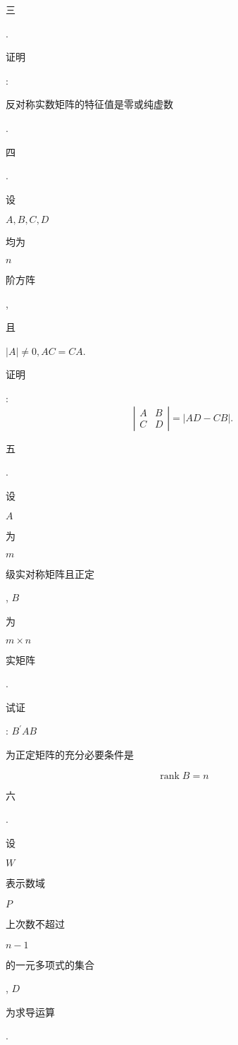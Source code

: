 \documentclass[10pt]{article}
\begin{document}
\begin{CJK}{UTF8}{mj}三\end{CJK}. \begin{CJK}{UTF8}{mj}证明\end{CJK}: \begin{CJK}{UTF8}{mj}反对称实数矩阵的特征值是零或纯虚数\end{CJK}.

\begin{CJK}{UTF8}{mj}四\end{CJK}. \begin{CJK}{UTF8}{mj}设\end{CJK} $A, B, C, D$ \begin{CJK}{UTF8}{mj}均为\end{CJK} $n$ \begin{CJK}{UTF8}{mj}阶方阵\end{CJK}, \begin{CJK}{UTF8}{mj}且\end{CJK} $|A| \neq 0, A C=C A$. \begin{CJK}{UTF8}{mj}证明\end{CJK}:
$$
\left|\begin{array}{ll}
A & B \\
C & D
\end{array}\right|=|A D-C B| .
$$
\begin{CJK}{UTF8}{mj}五\end{CJK}. \begin{CJK}{UTF8}{mj}设\end{CJK} $A$ \begin{CJK}{UTF8}{mj}为\end{CJK} $m$ \begin{CJK}{UTF8}{mj}级实对称矩阵且正定\end{CJK}, $B$ \begin{CJK}{UTF8}{mj}为\end{CJK} $m \times n$ \begin{CJK}{UTF8}{mj}实矩阵\end{CJK}. \begin{CJK}{UTF8}{mj}试证\end{CJK}: $B^{\prime} A B$ \begin{CJK}{UTF8}{mj}为正定矩阵的充分必要条件是\end{CJK}
$$
\operatorname{rank} B=n
$$
\begin{CJK}{UTF8}{mj}六\end{CJK}. \begin{CJK}{UTF8}{mj}设\end{CJK} $W$ \begin{CJK}{UTF8}{mj}表示数域\end{CJK} $P$ \begin{CJK}{UTF8}{mj}上次数不超过\end{CJK} $n-1$ \begin{CJK}{UTF8}{mj}的一元多项式的集合\end{CJK}, $D$ \begin{CJK}{UTF8}{mj}为求导运算\end{CJK}.
\end{document}
